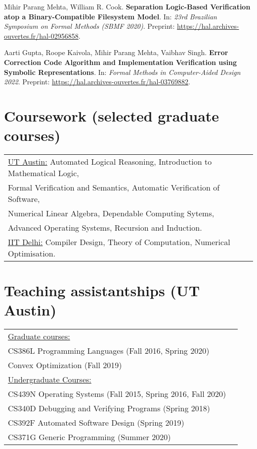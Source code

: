 \documentclass[margin]{res}
\begin{document}
\begin{resume}
  Mihir Parang Mehta, William R. Cook. {\bf Separation Logic-Based
    Verification atop a Binary-Compatible Filesystem Model}. In:
  \textit{23rd Brazilian Symposium on Formal Methods (SBMF 2020)}. Preprint:
  \url{https://hal.archives-ouvertes.fr/hal-02956858}.

  Aarti Gupta, Roope Kaivola, Mihir Parang Mehta, Vaibhav Singh. {\bf
    Error Correction Code Algorithm and Implementation Verification
    using Symbolic Representations}. In: \textit{Formal
    Methods in Computer-Aided Design 2022}. Preprint:
  \url{https://hal.archives-ouvertes.fr/hal-03769882}.

\section{Coursework (selected graduate courses)}
\begin{tabular}{l p{3in}}
  \underline{UT Austin:} Automated Logical Reasoning, Introduction to
  Mathematical Logic, \\ Formal Verification and Semantics, Automatic
  Verification of Software,\\ Numerical Linear Algebra, Dependable
  Computing Sytems, \\Advanced Operating Systems, Recursion and Induction. \\
  \underline{IIT Delhi:} Compiler Design,
  Theory of Computation, Numerical Optimisation.
\end{tabular}

\section{Teaching assistantships (UT Austin)}
\begin{tabular}{l p{3in}}
  \underline{Graduate courses:} \\
  CS386L Programming Languages (Fall 2016, Spring 2020) \\
  Convex Optimization (Fall 2019) \\
  \underline{Undergraduate Courses:} \\
  CS439N Operating Systems (Fall 2015, Spring 2016, Fall 2020) \\
  CS340D Debugging and Verifying Programs (Spring 2018) \\
  CS392F Automated Software Design (Spring 2019) \\
  CS371G Generic Programming (Summer 2020)
\end{tabular}


\end{resume}
\end{document}
